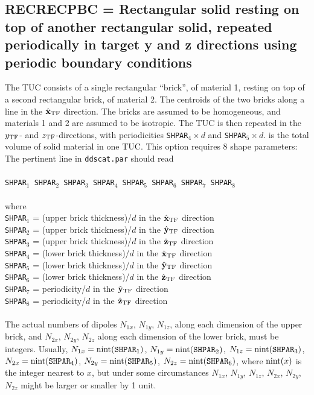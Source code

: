 \subsection{ RECRECPBC = Rectangular solid resting on top of another
                        rectangular solid, repeated periodically in
                        target y and z directions using
                        periodic boundary conditions}
            \label{sec:RECRECPBC}
	    The TUC consists of a single rectangular ``brick'', of material
	    1, resting on top of a second rectangular brick, of material 2.
	    The centroids of the two bricks along a line in the $\hat{\bf x}_{\rm TF}$
	    direction.
	    The bricks are assumed to be homogeneous, and materials 1 and
	    2 are assumed to be isotropic.
	    The TUC 
	    is then repeated in the $y_{\rm TF}$- and $z_{\rm TF}$-directions, with 
	    periodicities {\tt SHPAR}$_4\times d$ and 
	    {\tt SHPAR}$_5\times d$. 
	    is the total volume of solid material in one TUC.
	    This option requires 8 shape parameters:\newline
	    The pertinent line in {\tt ddscat.par} should read\\
	    \ \\
	{\tt SHPAR$_1$ SHPAR$_2$ SHPAR$_3$ SHPAR$_4$ SHPAR$_5$
             SHPAR$_6$ SHPAR$_7$ SHPAR$_8$}\\
	    \ \\
	where\\
	{\tt SHPAR}$_1$ = (upper brick thickness)/$d$ in the 
	$\hat{\bf x}_{\rm TF}$ direction\\
	{\tt SHPAR}$_2$ = (upper brick thickness)/$d$ in the 
	$\hat{\bf y}_{\rm TF}$ direction\\
	{\tt SHPAR}$_3$ = (upper brick thickness)/$d$ in the 
	$\hat{\bf z}_{\rm TF}$ direction\\
	{\tt SHPAR}$_4$ = (lower brick thickness)/$d$ in the 
	$\hat{\bf x}_{\rm TF}$ direction\\
	{\tt SHPAR}$_5$ = (lower brick thickness)/$d$ in the 
	$\hat{\bf y}_{\rm TF}$ direction\\
	{\tt SHPAR}$_6$ = (lower brick thickness)/$d$ in the 
	$\hat{\bf z}_{\rm TF}$ direction\\
	{\tt SHPAR}$_7$ = periodicity/$d$ in the $\hat{\bf y}_{\rm TF}$ direction\\
	{\tt SHPAR}$_8$ = periodicity/$d$ in the $\hat{\bf z}_{\rm TF}$ direction\\
	\ \\
	The actual numbers of dipoles $N_{1x}$, $N_{1y}$, $N_{1z}$,
	along each dimension of the upper brick, and $N_{2x}$, $N_{2y}$,
	$N_{2z}$ along each dimension of the lower brick, must be integers.
	Usually, 
	$N_{1x}={\rm nint}({\tt SHPAR}_1)$,
	$N_{1y}={\rm nint}({\tt SHPAR}_2)$,
	$N_{1z}={\rm nint}({\tt SHPAR}_3)$,
	$N_{2x}={\rm nint}({\tt SHPAR}_4)$,
	$N_{2y}={\rm nint}({\tt SHPAR}_5)$,
	$N_{2z}={\rm nint}({\tt SHPAR}_6)$,
	where ${\rm nint}(x)$ is the integer nearest to $x$, but
	under some circumstances $N_{1x}$, $N_{1y}$, $N_{1z}$,
	$N_{2x}$, $N_{2y}$, $N_{2z}$ might be larger or smaller by 1 unit.
	
